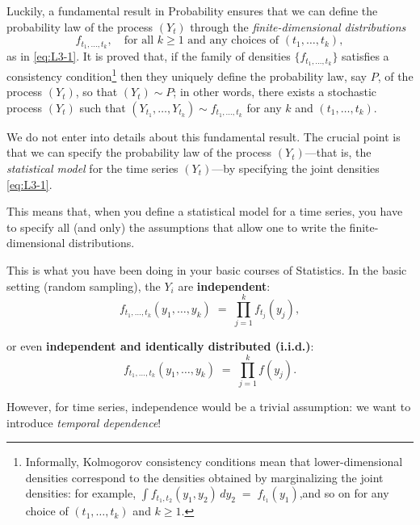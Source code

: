 \documentclass[dvipsnames,12pt]{book}
\begin{document}
                Luckily, a fundamental result in Probability ensures that we can define the probability law of the process $(Y_t)$ through the \emph{finite-dimensional distributions}
                \[
                  f_{t_1,\ldots,t_k}, 
                  \quad\text{for all } k \ge 1 \text{ and any choices of } (t_1,\ldots,t_k),
                \]
                as in \ref{eq:L3-1}. It is proved that, if the family of densities $\{f_{t_1,\ldots,t_k}\}$ satisfies a consistency condition\footnote{%
                  Informally, Kolmogorov consistency conditions mean that lower-dimensional densities correspond to the densities obtained by marginalizing the joint densities: for example, $\int f_{t_1,t_2}(y_1, y_2)\,d y_2  \;=\; f_{t_1}(y_1)$,and so on for any choice of $(t_1,\dots,t_k)$ and $k \ge 1$.}
                then they uniquely define the probability law, say $P$, of the process $(Y_t)$, so that $(Y_t) \sim P$; in other words, there exists a stochastic process $(Y_t)$ 
                such that $(Y_{t_1}, \ldots, Y_{t_k}) \sim f_{t_1,\ldots,t_k}$ for any $k$ 
                and $(t_1,\ldots,t_k)$.
                
                We do not enter into details about this fundamental result. The crucial point is that we can specify the probability law of the process $(Y_t)$---that is, the \emph{statistical model} for the time series $(Y_t)$---by specifying the joint densities \ref{eq:L3-1}. 

                \begin{remark}
                    This means that, when you define a statistical model for a time series, you have to specify all (and only) the assumptions that allow one to write the finite-dimensional distributions.
                \end{remark}
                
                This is what you have been doing in your basic courses of Statistics. In the basic setting (random sampling), the $Y_i$ are \textbf{independent}:
                    \[
                      f_{t_1,\ldots,t_k}(y_1,\ldots,y_k) 
                      \;=\; \prod_{j=1}^k f_{t_j}(y_j),
                    \]

                or even \textbf{independent and identically distributed (i.i.d.)}:
                    \[
                      f_{t_1,\ldots,t_k}(y_1,\ldots,y_k) 
                      \;=\; \prod_{j=1}^k f(y_j).
                    \]
                
                However, for time series, independence would be a trivial assumption: we want to introduce \emph{temporal dependence}!
                
\end{document}
